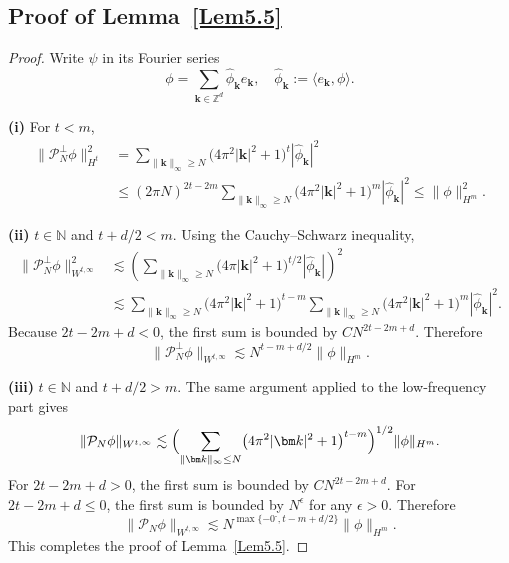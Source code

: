 \documentclass{sn-jnl}%
\newcommand{\m}{\textbf{-}}
\numberwithin{equation}{section}
\theoremstyle{thmstyleone}%
\theoremstyle{thmstyletwo}%
\theoremstyle{thmstylethree}%
\begin{document}
\begin{appendices}

\section{Proof of Lemma~\ref{Lem5.5}} \label{proofLem5.5}
\begin{proof} 
    Write $\psi$ in its Fourier series
    \begin{equation}
        \phi = \sum_{\bm k \in \mathbb{Z}^d} \hat{\phi}_{\bm k} e_{\bm k},\quad \hat{\phi}_{\bm k} := \langle e_{\bm k},\phi \rangle.
    \end{equation}

    \noindent\textbf{(i)} For $t<m$,
    \[
    \begin{aligned}
        \|\mathcal{P}_N^\perp \phi\|_{H^t}^2 
        &= \sum_{\|\bm k\|_{\infty}\ge N} \bigl(4\pi^2|\bm k|^2+1\bigr)^{t}|\hat{\phi}_{\bm k}|^2\\
        &\leq (2\pi N)^{2t-2m}\sum_{\|\bm k\|_{\infty}\ge N} \bigl(4\pi^2|\bm k|^2+1\bigr)^{m}|\hat{\phi}_{\bm k}|^2\leq\|\phi\|_{H^m}^2.
    \end{aligned}
    \]

    \noindent\textbf{(ii)}  $t\in \mathbb{N}$ and $t+d/2<m$.  Using the Cauchy–Schwarz inequality,
    \[
    \begin{aligned}
        \|\mathcal{P}_N^\perp \phi\|_{W^{t,\infty}}^2 
        &\lesssim \left(\sum_{\|\bm k\|_{\infty}\ge N} \big(4\pi|\bm k|^2+1\big)^{t/2}|\hat{\phi}_{\bm k}|\right)^2\\
        &\lesssim \sum_{\|\bm k\|_{\infty}\ge N}\bigl(4\pi^2|\bm k|^2+1\bigr)^{t-m}\sum_{\|\bm k\|_{\infty}\ge N} \bigl(4\pi^2|\bm k|^2+1\bigr)^{m}|\hat{\phi}_{\bm k}|^2 .
    \end{aligned}
    \]
    Because $2t-2m+d<0$, the first sum is bounded by $CN^{2t-2m+d}$. Therefore
    \[
        \|\mathcal{P}_N^\perp \phi\|_{W^{t,\infty}}\lesssim N^{t-m+d/2}\|\phi\|_{H^m}.
    \]

    \noindent\textbf{(iii)}  $t\in \mathbb{N}$ and $t+d/2>m$.  The same argument applied to the low‑frequency part gives
    \[
    \begin{aligned}
        \|\mathcal{P}_N \phi\|_{W^{t,\infty}} \lesssim \Bigl(\sum_{\|\bm k\|_{\infty}\le N}\bigl(4\pi^2|\bm k|^2+1\bigr)^{t-m}\Bigr)^{1/2}\|\phi\|_{H^m}.
    \end{aligned}
    \]
    For $2t-2m+d>0$, the first sum is bounded by $CN^{2t-2m+d}$. For $2t-2m+d\leq 0$, the first sum is bounded by $N^{\epsilon}$ for any $\epsilon>0$. Therefore
    \[
        \|\mathcal{P}_N \phi\|_{W^{t,\infty}}\lesssim N^{\max\{-0^{\m},t-m+d/2\}}\|\phi\|_{H^m}.
    \]
    This completes the proof of Lemma~\ref{Lem5.5}.
\end{proof}



\end{appendices}
\end{document}
